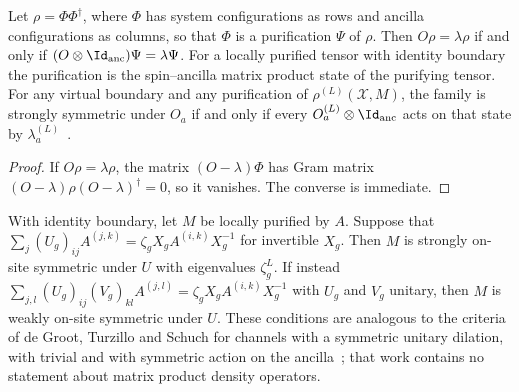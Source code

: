 \begin{lemma}\label{thm:mpdo_strong_symmetry_purification}
    \leanok
    Let $\rho=\Phi\Phi^\dagger$, where $\Phi$ has system configurations as
    rows and ancilla configurations as columns, so that $\Phi$ is a
    purification $\Psi$ of $\rho$. Then $O\rho=\lambda\rho$ if and only if
    $(O\otimes\Id_{\mathrm{anc}})\Psi=\lambda\Psi$. For a locally purified
    tensor with identity boundary the purification is the spin--ancilla
    matrix product state of the purifying tensor. For any virtual boundary
    and any purification of $\rho^{(L)}(\mathcal X,M)$,
    the family is strongly symmetric under $O_a$ if
    and only if every $O_a^{(L)}\otimes\Id_{\mathrm{anc}}$ acts on that
    state by $\lambda_a^{(L)}$~\cite{Sun2025Anomalous}.
\end{lemma}

\begin{proof}\leanok
    If $O\rho=\lambda\rho$, the matrix $(O-\lambda)\Phi$ has Gram matrix
    $(O-\lambda)\rho(O-\lambda)^\dagger=0$, so it vanishes. The converse is
    immediate.
\end{proof}

\begin{lemma}\label{thm:mpdo_symmetry_local_conditions}
    \leanok
    With identity boundary, let $M$ be locally purified by $A$. Suppose that
    $\sum_j(U_g)_{ij}A^{(j,k)}=\zeta_gX_gA^{(i,k)}X_g^{-1}$ for invertible
    $X_g$. Then $M$ is strongly on-site symmetric under $U$ with
    eigenvalues $\zeta_g^L$. If instead
    $\sum_{j,l}(U_g)_{ij}(V_g)_{kl}A^{(j,l)}=\zeta_gX_gA^{(i,k)}X_g^{-1}$
    with $U_g$ and $V_g$ unitary, then $M$ is weakly on-site symmetric under
    $U$. These conditions are analogous to the criteria of de Groot,
    Turzillo and Schuch for channels with a symmetric unitary dilation, with
    trivial and with symmetric action on the
    ancilla~\cite{deGroot2022SPTOpen}; that work contains no statement about
    matrix product density operators.
\end{lemma}

